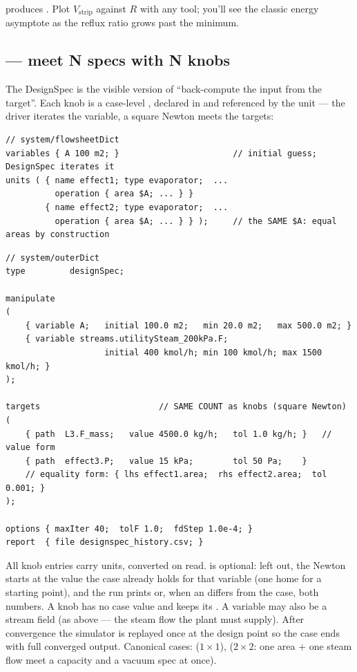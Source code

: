 \documentclass[11pt,a4paper]{article}
\begin{document}
\begin{tryit}
produces .  Plot $V_{\mathrm{strip}}$ against
$R$ with any tool; you'll see the classic energy asymptote as the
reflux ratio grows past the minimum.
\end{tryit}

\subsection{ --- meet N specs with N knobs}\label{sec:designspec}

The DesignSpec is the visible version of ``back-compute the input from
the target''.  Each knob is a case-level , declared in
 and referenced by the unit --- the driver iterates
the variable, a square Newton meets the targets:

\begin{lstlisting}[language=dict]
// system/flowsheetDict
variables { A 100 m2; }                       // initial guess; DesignSpec iterates it
units ( { name effect1; type evaporator;  ...
          operation { area $A; ... } }
        { name effect2; type evaporator;  ...
          operation { area $A; ... } } );     // the SAME $A: equal areas by construction
\end{lstlisting}

\begin{lstlisting}[language=dict]
// system/outerDict
type         designSpec;

manipulate
(
    { variable A;   initial 100.0 m2;   min 20.0 m2;   max 500.0 m2; }
    { variable streams.utilitySteam_200kPa.F;
                    initial 400 kmol/h; min 100 kmol/h; max 1500 kmol/h; }
);

targets                        // SAME COUNT as knobs (square Newton)
(
    { path  L3.F_mass;   value 4500.0 kg/h;   tol 1.0 kg/h; }   // value form
    { path  effect3.P;   value 15 kPa;        tol 50 Pa;    }
    // equality form: { lhs effect1.area;  rhs effect2.area;  tol 0.001; }
);

options { maxIter 40;  tolF 1.0;  fdStep 1.0e-4; }
report  { file designspec_history.csv; }
\end{lstlisting}

All knob entries carry units, converted on read.   is
optional: left out, the Newton starts at the value the case already holds
for that variable (one home for a starting point), and the run prints
 or, when an  differs from the case,
both numbers.  A  knob has no case value and keeps its
.  A 
variable may also be a stream field (as above --- the steam flow the
plant must supply).  After convergence the simulator is replayed once
at the design point so the case ends with full converged output.
Canonical cases:  ($1\times1$),
 ($2\times2$: one area + one
steam flow meet a capacity and a vacuum spec at once).
\end{document}
